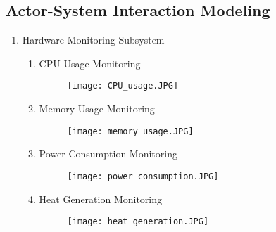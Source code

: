 \documentclass{article}
\begin{document}
	\subsection{Actor-System Interaction Modeling}
    	\begin{enumerate}
    		\item{Hardware Monitoring Subsystem}
        		\begin{enumerate}
                    \item{CPU Usage Monitoring}
                    \begin{figure}[!ht]
                    	\centering
                        \texttt{[image: CPU\_usage.JPG]}	
                        \newline
                        \newline
                    \end{figure}
                    
                    \item{Memory Usage Monitoring}
                    \begin{figure}[H]
                    	\centering
                        \texttt{[image: memory\_usage.JPG]}
                        \newline
                        \newline
                    \end{figure}
                    
                    
                    \item{Power Consumption Monitoring}
                    \begin{figure}[H]
                    	\centering
                        \texttt{[image: power\_consumption.JPG]}
                        \newline
                        \newline
                    \end{figure}
                    
                    \item{Heat Generation Monitoring}
                    \begin{figure}[H]
                    	\centering
                        \texttt{[image: heat\_generation.JPG]}
                        \newline
                        \newline
                    \end{figure}
                    

\end{enumerate}
\end{enumerate}
\end{document}
